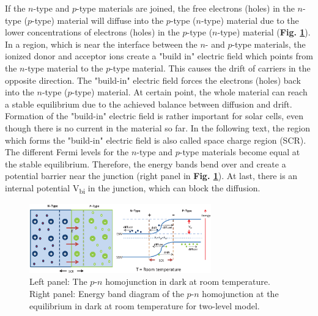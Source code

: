 \documentclass[a4paper, 12pt, titlepage,oneside,drop]{kthesis}
\begin{document}
If the $n$-type and $p$-type materials are joined, the free electrons (holes) in the $n$-type ($p$-type) material will diffuse into the $p$-type ($n$-type) material due to the
lower concentrations of electrons (holes) in the $p$-type ($n$-type) material (\textbf{Fig. \ref{pnjunction}}). In a region, which is near the interface between the $n$- and $p$-type materials, the ionized donor and acceptor ions create a
"build in" electric field which points from the $n$-type material to the $p$-type material. This causes the drift of carriers in the opposite direction. The "build-in" electric field forces the electrons (holes) back into
the $n$-type ($p$-type) material. At certain point, 
the whole material can reach a stable equilibrium due to the achieved balance between diffusion and drift. Formation of the "build-in" electric field is rather important for solar cells, even though there is no current in 
the material so far. In the following text, the region which forms the "build-in" electric field is also called space charge region (SCR). The different Fermi levels for the $n$-type and $p$-type materials become
equal at the stable equilibrium. Therefore, the energy bands bend over and create a potential barrier near the junction (right panel in \textbf{Fig. \ref{pnjunction}}). At last, there is an internal potential V\textsubscript{bi}
in the junction, which can block the diffusion.

\begin{figure}[H]
    \begin{center}
            \includegraphics[width=0.7\textwidth]{pnjunction.eps}
     \end{center}
    \caption{Left panel: The $p$-$n$ homojunction in dark at room temperature. Right panel: Energy band diagram of the $p$-$n$ homojunction at the equilibrium in dark at room temperature for two-level model. }      
    \label{pnjunction}
\end{figure}
\end{document}
